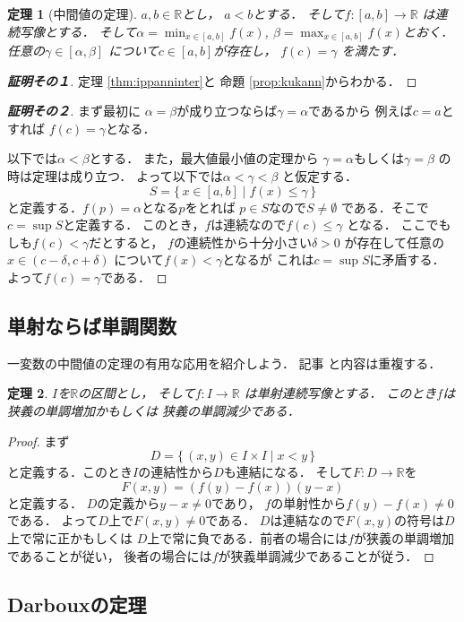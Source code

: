 \documentclass[leqno, a4paper, 12pt]{jsarticle}
\newtheorem{thm}{定理}
\newcommand{\rr}{\mathbb{R}}
\begin{document}
\begin{thm}[中間値の定理]
$a, b\in \rr$とし，
$a<b$とする．
そして$f: [a, b]\to \rr$
は連続写像とする．
そして$\alpha=\min_{x\in [a, b]}f(x)$, 
$\beta=\max_{x\in [a, b]}f(x)$とおく．
任意の$\gamma\in [\alpha, \beta]$
について$c\in [a, b]$が存在し，
$f(c)=\gamma$
を満たす．
\end{thm}
\begin{proof}[\textbf{証明その１}]
定理 \ref{thm:ippanninter}と
命題 \ref{prop:kukann}からわかる．
\end{proof}
\begin{proof}[\textbf{証明その２}]
まず最初に
$\alpha=\beta$が成り立つならば$\gamma=\alpha$であるから
例えば$c=a$とすれば
$f(c)=\gamma$となる．

以下では$\alpha<\beta$とする．
また，最大値最小値の定理から
$\gamma=\alpha$もしくは$\gamma=\beta$
の時は定理は成り立つ．
よって以下では$\alpha<\gamma<\beta$
と仮定する．
\[
S=\{\, x\in [a, b]\mid f(x)\le \gamma\, \}
\]
と定義する．$f(p)=\alpha$となる$p$をとれば
$p\in S$なので$S\neq \emptyset$
である．そこで$c=\sup S$と定義する．
このとき，$f$は連続なので$f(c)\le \gamma$
となる．
ここでもしも$f(c)<\gamma$だとすると，
$f$の連続性から十分小さい$\delta>0$
が存在して任意の$x\in (c-\delta, c+\delta)$
について$f(x)<\gamma$となるが
これは$c=\sup S$に矛盾する．
よって$f(c)=\gamma$である．
\end{proof}

\subsection{単射ならば単調関数}
一変数の中間値の定理の有用な応用を紹介しよう．
記事
\cite{denden}と内容は重複する．
\begin{thm}
$I$を$\rr$の区間とし，
そして$f: I\to \rr$
は単射連続写像とする．
このとき$f$は狭義の単調増加かもしくは
狭義の単調減少である．
\end{thm}
\begin{proof}
まず
\[
D=\{\, 
(x, y)\in I\times I\mid 
x<y
\, \}
\]
と定義する．このとき$I$の連結性から$D$も連結になる．
そして$F: D\to \rr$を
\[
F(x, y)=(f(y)-f(x))(y-x)
\]
と定義する．
$D$の定義から$y-x\neq 0$であり，
$f$の単射性から$f(y)-f(x)\neq 0$である．
よって$D$上で$F(x, y)\neq 0$である．
$D$は連結なので$F(x, y)$の符号は$D$上で常に正かもしくは
$D$上で常に負である．前者の場合には$f$が狭義の単調増加であることが従い，
後者の場合には$f$が狭義単調減少であることが従う．
\end{proof}

\subsection{Darbouxの定理}
\end{document}
